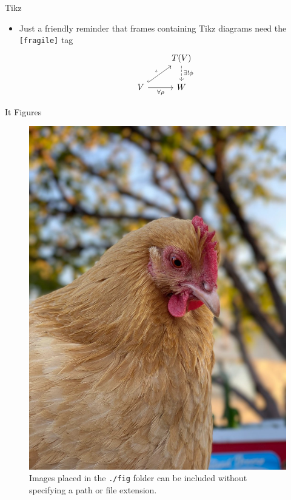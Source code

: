 \documentclass[pdf, fleqn, compress]{beamer}
\begin{document}
\begin{frame}[fragile]{Tikz}
	\begin{itemize}
		\item	Just a friendly reminder that frames containing Tikz diagrams need the \texttt{[fragile]} tag
				\begin{equation}
					\begin{tikzcd}
						&
						T(V)
							\ar[d, dashed, "\exists ! \phi"]
						\\
						V
							\ar[ur, hookrightarrow, "\iota"]
							\ar[r, swap, "\forall \rho"]
						&
						W		
					\end{tikzcd}
				\end{equation}
	\end{itemize}
\end{frame}

\begin{frame}{It Figures}
	\begin{figure}
		\centering
			\includegraphics[width=0.7\linewidth]{chicken}
		\caption{Images placed in the \texttt{./fig} folder can be included without specifying a path or file extension.}
	\end{figure}
\end{frame}
\end{document}

